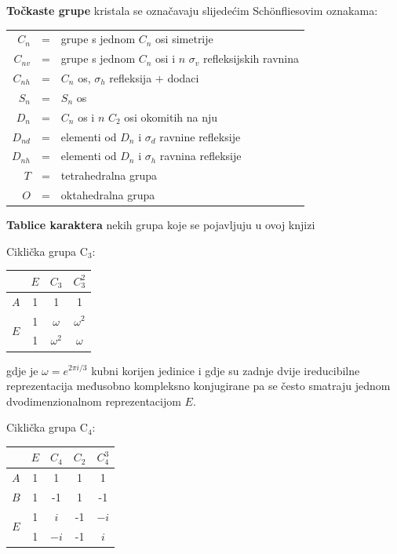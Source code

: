 \textbf{Točkaste grupe} kristala se označavaju slijedećim
Sch\"{o}nfliesovim oznakama:
\begin{center}
\begin{tabular}{rcl}
$C_n$ & = & grupe s jednom $C_n$ osi simetrije \\
$C_{nv}$ & = & grupe s jednom $C_n$ osi i $n$ $\sigma_v$
   refleksijskih ravnina  \\
$C_{nh}$ & = & $C_n$ os,  $\sigma_h$ refleksija $+$ dodaci \\
$S_{n}$ & = & $S_n$ os \\
$D_{n}$ & = & $C_n$ os i $n$ $C_2$ osi okomitih na nju \\
$D_{nd}$ & = & elementi od $D_{n}$ i $\sigma_d$ ravnine refleksije \\
$D_{nh}$ & = & elementi od $D_{n}$ i $\sigma_h$ ravnina refleksije \\
$T$  & = & tetrahedralna grupa \\
$O$  & = & oktahedralna grupa 
\end{tabular}
\end{center}

\textbf{Tablice karaktera} nekih grupa koje se pojavljuju u ovoj knjizi

Ciklička grupa C$_3$: 
\begin{center}
\begin{tabular}{c|ccc}
     & $E$ & $C_3$ & $C_{3}^2$ \\ \hline
    $A$ & 1 & 1 & 1 \\
    \multirow{2}{*}{$E$} & 1 & $\omega$ & $\omega^2$ \\
     & 1 & $\omega^2$ & $\omega$ \\
\end{tabular}
\end{center}
gdje je $\omega = e^{2\pi i/3}$ kubni korijen jedinice i
gdje su zadnje dvije ireducibilne reprezentacija međusobno
kompleksno konjugirane pa se često smatraju jednom dvodimenzionalnom
reprezentacijom $E$.

Ciklička grupa C$_4$: 
\begin{center}
\begin{tabular}{c|cccc}
     & $E$ & $C_4$ & $C_2$ & $C_{4}^3$ \\ \hline
    $A$ & 1 & 1 & 1 & 1 \\
    $B$ & 1 & -1 & 1 & -1 \\
    \multirow{2}{*}{$E$} & 1 & $i$ & -1 & $-i$ \\
     & 1 & $-i$ & -1 & $i$ \\
\end{tabular}
\end{center}

